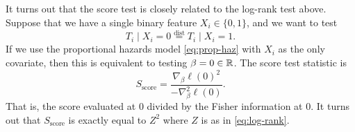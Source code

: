 It turns out that the score test is closely related to the log-rank test above. Suppose that we have a single binary feature $X_i \in \{0,1\}$, and we want to test 
\[T_i \mid X_i=0 \stackrel{\text{dist}}{=} T_i \mid X_i = 1.\] 
If we use the proportional hazards model \eqref{eq:prop-haz} with $X_i$ as the only covariate, then this is equivalent to testing $\beta=0 \in \mathbb{R}$. The score test statistic is
\[S_{\text{score}} = \frac{\nabla_\beta \ell(0)^2}{-\nabla_\beta^2 \ell(0)}.\]
That is, the score evaluated at $0$ divided by the Fisher information at $0$. It turns out that $S_{\text{score}}$ is exactly equal to $Z^2$ where $Z$ is as in \eqref{eq:log-rank}. 